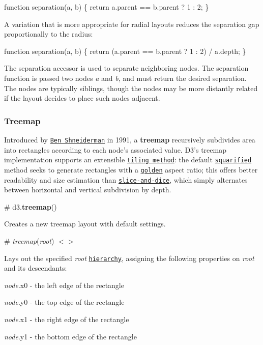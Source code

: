 \begin{DoxyCode}
function separation(a, b) \{
  return a.parent == b.parent ? 1 : 2;
\}
\end{DoxyCode}


A variation that is more appropriate for radial layouts reduces the separation gap proportionally to the radius\+:


\begin{DoxyCode}
function separation(a, b) \{
  return (a.parent == b.parent ? 1 : 2) / a.depth;
\}
\end{DoxyCode}


The separation accessor is used to separate neighboring nodes. The separation function is passed two nodes {\itshape a} and {\itshape b}, and must return the desired separation. The nodes are typically siblings, though the nodes may be more distantly related if the layout decides to place such nodes adjacent.

\subsubsection*{Treemap}

\href{http://bl.ocks.org/mbostock/6bbb0a7ff7686b124d80}{\tt }

Introduced by \href{http://www.cs.umd.edu/hcil/treemap-history/}{\tt Ben Shneiderman} in 1991, a {\bfseries treemap} recursively subdivides area into rectangles according to each node’s associated value. D3’s treemap implementation supports an extensible \href{#treemap_tile}{\tt tiling method}\+: the default \href{#treemapSquarify}{\tt squarified} method seeks to generate rectangles with a \href{https://en.wikipedia.org/wiki/Golden_ratio}{\tt golden} aspect ratio; this offers better readability and size estimation than \href{#treemapSliceDice}{\tt slice-\/and-\/dice}, which simply alternates between horizontal and vertical subdivision by depth.

\label{_treemap}%
\# d3.{\bfseries treemap}()

Creates a new treemap layout with default settings.

\label{__treemap}%
\# {\itshape treemap}({\itshape root}) \href{https://github.com/d3/d3-hierarchy/blob/master/src/treemap/index.js#L18}{\tt $<$$>$}

Lays out the specified {\itshape root} \href{#hierarchy}{\tt hierarchy}, assigning the following properties on {\itshape root} and its descendants\+:


\begin{DoxyItemize}
\item {\itshape node}.x0 -\/ the left edge of the rectangle
\item {\itshape node}.y0 -\/ the top edge of the rectangle
\item {\itshape node}.x1 -\/ the right edge of the rectangle
\item {\itshape node}.y1 -\/ the bottom edge of the rectangle
\end{DoxyItemize}

